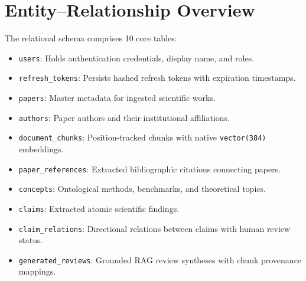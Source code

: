 \documentclass[11pt,a4paper,titlepage]{report}
\begin{document}
\begin{center}
\vspace{2pt}
\label{fig:uml_class}
\end{center}

\section{Entity–Relationship Overview}
The relational schema comprises 10 core tables:
\begin{itemize}
    \item \texttt{users}: Holds authentication credentials, display name, and roles.
    \item \texttt{refresh\_tokens}: Persists hashed refresh tokens with expiration timestamps.
    \item \texttt{papers}: Master metadata for ingested scientific works.
    \item \texttt{authors}: Paper authors and their institutional affiliations.
    \item \texttt{document\_chunks}: Position-tracked chunks with native \texttt{vector(384)} embeddings.
    \item \texttt{paper\_references}: Extracted bibliographic citations connecting papers.
    \item \texttt{concepts}: Ontological methods, benchmarks, and theoretical topics.
    \item \texttt{claims}: Extracted atomic scientific findings.
    \item \texttt{claim\_relations}: Directional relations between claims with human review status.
    \item \texttt{generated\_reviews}: Grounded RAG review syntheses with chunk provenance mappings.
\end{itemize}
\end{document}
